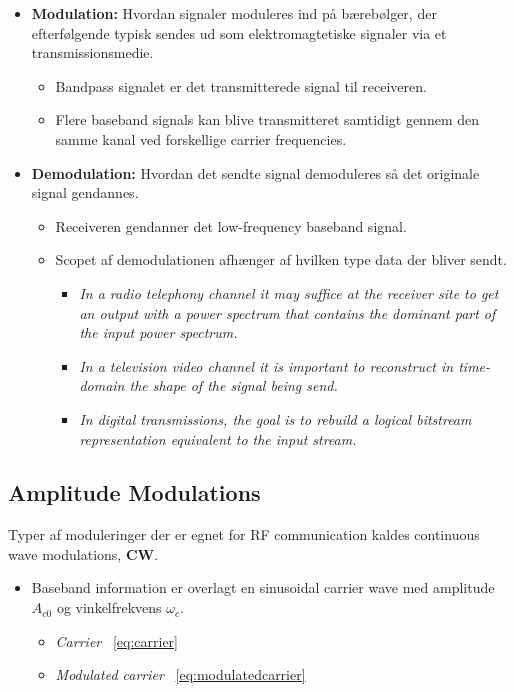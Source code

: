 \begin{itemize}
	\item \textbf{Modulation:} Hvordan signaler moduleres ind på bærebølger, der efterfølgende typisk sendes ud som elektromagtetiske signaler via et transmissionsmedie.
	\begin{itemize}
		\item Bandpass signalet er det transmitterede signal til receiveren. 
		\item  Flere baseband signals kan blive transmitteret samtidigt gennem den samme kanal ved forskellige carrier frequencies.
	\end{itemize}
	\item \textbf{Demodulation:} Hvordan det sendte signal demoduleres så det originale signal gendannes. 
	\begin{itemize}
		\item Receiveren gendanner det low-frequency baseband signal.
		\item Scopet af demodulationen afhænger af hvilken type data der bliver sendt.
		\begin{itemize}
			\item \textit{In a radio telephony channel it may suffice at the receiver site to get an output with a power spectrum that contains the dominant part of the input power spectrum.}
			\item  \textit{In a television video channel it is important to reconstruct in time-domain the shape of the signal being send. }
			\item \textit{In digital transmissions, the goal is to rebuild a logical bitstream representation equivalent to the input stream.}
		\end{itemize}
	\end{itemize}
\end{itemize}

\subsection{Amplitude Modulations}
Typer af moduleringer der er egnet for RF communication kaldes
continuous wave modulations, \textbf{CW}.
\begin{itemize}
	\item Baseband information er overlagt en sinusoidal carrier wave med amplitude $A_{c0}$ og vinkelfrekvens $\omega_c$.
	\begin{itemize}
		\item \textit{Carrier} ~\ref{eq:carrier}
		\item \textit{Modulated carrier} ~\ref{eq:modulatedcarrier}
	\end{itemize}
\end{itemize} 


